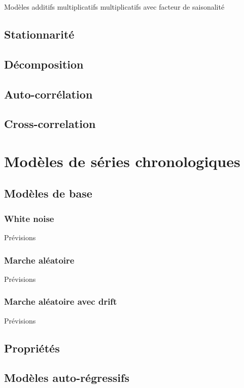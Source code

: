 \documentclass[french]{article}
\begin{document}
\begin{multicols*}{2}
Modèles
	additifs
	multiplicatifs
	multiplicatifs avec facteur de saisonalité

\subsection{Stationnarité}


\subsection{Décomposition}


\subsection{Auto-corrélation}


\subsection{Cross-correlation}


\newpage
\section{Modèles de séries chronologiques}
\subsection{Modèles de base}
\subsubsection{White noise}
	Prévisions

\subsubsection{Marche aléatoire}
	Prévisions

\subsubsection{Marche aléatoire avec drift}
	Prévisions


\subsection{Propriétés}

\subsection{Modèles auto-régressifs}



\end{multicols*}
\end{document}
